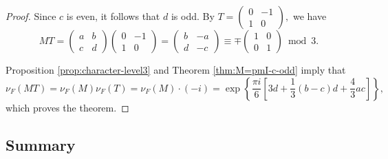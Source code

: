 \documentclass[12pt]{article}
\theoremstyle{definition}
\numberwithin{equation}{section}
\numberwithin{theorem}{section}
\begin{document}
\begin{proof}
Since $c$ is even, it follows that $d$ is odd. 
By 
$
T
=
\begin{pmatrix}
0 & -1 \\
1 & 0
\end{pmatrix}, 
$ 
we have 
\begin{equation*}
MT
=
\begin{pmatrix}
a & b \\
c & d
\end{pmatrix}
\begin{pmatrix}
0 & -1 \\
1 & 0
\end{pmatrix}
=
\begin{pmatrix}
b & -a \\
d & -c
\end{pmatrix}
\equiv
\mp
\begin{pmatrix}
1 & 0 \\
0 & 1
\end{pmatrix}
\bmod{3}.
\end{equation*}
\par
Proposition \ref{prop:character-level3} and Theorem \ref{thm:M=pmI-c-odd} 
imply that 
\begin{equation*}
\nu_{F}(MT)=\nu_{F}(M)\nu_{F}(T)=\nu_{F}(M)\cdot(-i)
=
\exp
\left\{
\frac{\pi i}{6}
\left[
3d+\frac13(b-c)d+
\frac43ac
\right]
\right\},
\end{equation*}
which proves the theorem. 
\end{proof}






\subsection{Summary}
\end{document}
